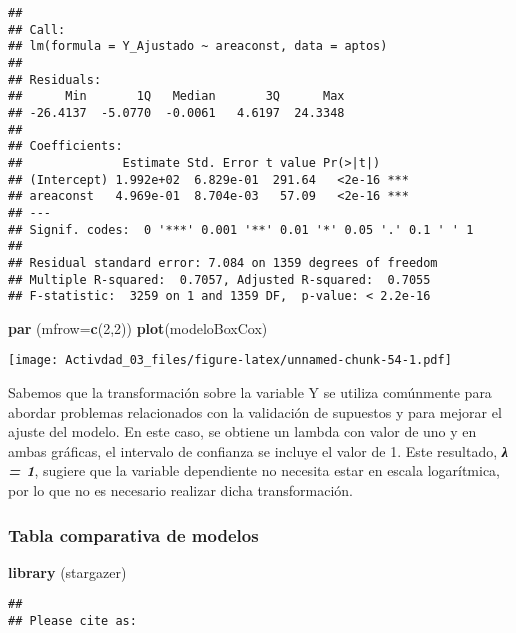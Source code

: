 \documentclass[
]{article}
\newenvironment{Shaded}{\begin{snugshade}}{\end{snugshade}}
\newcommand{\AttributeTok}[1]{\textcolor[rgb]{0.13,0.29,0.53}{#1}}
\newcommand{\DecValTok}[1]{\textcolor[rgb]{0.00,0.00,0.81}{#1}}
\newcommand{\FunctionTok}[1]{\textcolor[rgb]{0.13,0.29,0.53}{\textbf{#1}}}
\newcommand{\NormalTok}[1]{#1}
\begin{document}
\begin{verbatim}
## 
## Call:
## lm(formula = Y_Ajustado ~ areaconst, data = aptos)
## 
## Residuals:
##      Min       1Q   Median       3Q      Max 
## -26.4137  -5.0770  -0.0061   4.6197  24.3348 
## 
## Coefficients:
##              Estimate Std. Error t value Pr(>|t|)    
## (Intercept) 1.992e+02  6.829e-01  291.64   <2e-16 ***
## areaconst   4.969e-01  8.704e-03   57.09   <2e-16 ***
## ---
## Signif. codes:  0 '***' 0.001 '**' 0.01 '*' 0.05 '.' 0.1 ' ' 1
## 
## Residual standard error: 7.084 on 1359 degrees of freedom
## Multiple R-squared:  0.7057, Adjusted R-squared:  0.7055 
## F-statistic:  3259 on 1 and 1359 DF,  p-value: < 2.2e-16
\end{verbatim}

\begin{Shaded}
\begin{Highlighting}[]
\FunctionTok{par}\NormalTok{ (}\AttributeTok{mfrow=}\FunctionTok{c}\NormalTok{(}\DecValTok{2}\NormalTok{,}\DecValTok{2}\NormalTok{))}
\FunctionTok{plot}\NormalTok{(modeloBoxCox)}
\end{Highlighting}
\end{Shaded}

\texttt{[image: Activdad\_03\_files/figure-latex/unnamed-chunk-54-1.pdf]}

Sabemos que la transformación sobre la variable Y se utiliza comúnmente
para abordar problemas relacionados con la validación de supuestos y
para mejorar el ajuste del modelo. En este caso, se obtiene un lambda
con valor de uno y en ambas gráficas, el intervalo de confianza se
incluye el valor de 1. Este resultado, \textbf{\emph{λ = 1}}, sugiere
que la variable dependiente no necesita estar en escala logarítmica, por
lo que no es necesario realizar dicha transformación.

\subsubsection{Tabla comparativa de
modelos}\label{tabla-comparativa-de-modelos}

\begin{Shaded}
\begin{Highlighting}[]
\FunctionTok{library}\NormalTok{ (stargazer)}
\end{Highlighting}
\end{Shaded}

\begin{verbatim}
## 
## Please cite as:
\end{verbatim}
\end{document}
